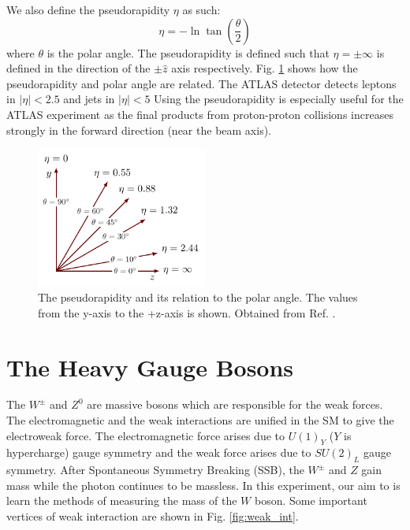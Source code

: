 \documentclass[a4paper]{report}
\numberwithin{equation}{section}
\begin{document}
We also define the pseudorapidity $\eta$ as such: 
\begin{equation}
	\eta = -\ln \tan (\frac{\theta}{2})
\end{equation}
where $\theta$ is the polar angle. The pseudorapidity is defined such that $\eta = \pm\infty$ is defined in the direction of the 
$\pm \hat{z}$ axis respectively. Fig. \ref{fig:pseudorap} shows how the pseudorapidity and polar angle are related. The ATLAS 
detector detects leptons in $|\eta| < 2.5$ and jets in $|\eta| < 5$
Using the pseudorapidity is especially useful for the ATLAS experiment as the final products from proton-proton collisions increases 
strongly in the forward direction (near the beam axis). 

\begin{figure}[htpb]
    \centering
    \includegraphics[width=0.5\textwidth]{pseudorapidity.pdf}
    \caption{The pseudorapidity and its relation to the polar angle. The values from the y-axis to the +z-axis is shown. 
	Obtained from Ref. \cite{Izaak2017}.}
    \label{fig:pseudorap}
\end{figure}


\section{The Heavy Gauge Bosons} \label{sec:gauge_bosons}

The $W^{\pm}$ and $Z^0$ are massive bosons which are responsible for the weak forces. The electromagnetic and the weak interactions are unified in the SM to give the electroweak force. The electromagnetic force arises due to $U(1)_{Y}$ ($Y$ is hypercharge) gauge symmetry and the weak force arises due to $SU(2)_L$ gauge symmetry. After Spontaneous Symmetry Breaking (SSB), the $W^{\pm}$ and $Z$ gain mass while the photon continues to be massless. In this experiment, our aim to is learn the methods of measuring the mass of the $W$ boson. Some important vertices of weak interaction are shown in Fig. \ref{fig:weak_int}.
\end{document}
